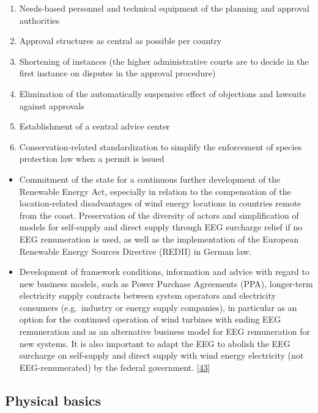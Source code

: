 \documentclass[a4paper,11pt]{article}
\providecommand{\tightlist}{%
  \setlength{\itemsep}{0pt}\setlength{\parskip}{0pt}}
\begin{document}
\begin{enumerate}
\def\labelenumi{\arabic{enumi}.}
\tightlist
\item
  Needs-based personnel and technical equipment of the planning and approval authorities
\item
  Approval structures as central as possible per country
\item
  Shortening of instances (the higher administrative courts are to decide in the first instance on disputes in the approval procedure)
\item
  Elimination of the automatically suspensive effect of objections and lawsuits against approvals
\item
  Establishment of a central advice center
\item
  Conservation-related standardization to simplify the enforcement of species protection law when a permit is issued
\end{enumerate}
\begin{itemize}
\item
  Commitment of the state for a continuous further development of the Renewable Energy Act, especially in relation to the compensation of the location-related disadvantages of wind energy locations in countries remote from the coast. Preservation of the diversity of actors and simplification of models for self-supply and direct supply through EEG surcharge relief if no EEG remuneration is used, as well as the implementation of the European Renewable Energy Sources Directive (REDII) in German law.
\item
  Development of framework conditions, information and advice with regard to new business models, such as Power Purchase Agreements (PPA), longer-term electricity supply contracts between system operators and electricity consumers (e.g.~industry or energy supply companies), in particular as an option for the continued operation of wind turbines with ending EEG remuneration and as an alternative business model for EEG remuneration for new systems. It is also important to adapt the EEG to abolish the EEG surcharge on self-supply and direct supply with wind energy electricity (not EEG-remunerated) by the federal government.
  {[}\protect\hyperlink{ref-MinisteriumfurUmweltEnergieErnahrungundForsten.2020}{43}{]}
\end{itemize}
\hypertarget{physical-basics}{%
\subsection{Physical basics}\label{physical-basics}}
\end{document}
